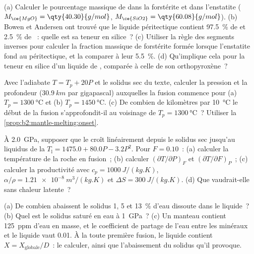 \begin{exercise}[$\star\star$]\label{exo:b2:mantle-melting:6}
(a) Calculer le pourcentage massique de  dans la forstérite  et dans
l'enstatite  ($M_{\ce{MgO}} = \qty{40.30}{g/mol}$, $M_{\ce{SiO2}} =
\qty{60.08}{g/mol}$). (b) Bowen et Andersen ont trouvé que le liquide péritectique contient
\qty{97.5}{\percent} de  et \qty{2.5}{\percent} de ~: quelle est sa
teneur en silice~? (c) Utiliser la règle des segments inverses pour calculer la fraction massique de forstérite
formée lorsque l'enstatite fond au péritectique, et la comparer à leur
\qty{5.5}{\percent}. (d) Qu'implique cela pour la teneur en silice d'un liquide de
, comparée à celle de son orthopyroxène~?
\end{exercise}

\begin{exercise}[$\star\star$]\label{exo:b2:mantle-melting:7}
Avec l'adiabate $T = T_p + 20P$ et le solidus sec du texte, calculer la
pression et la profondeur ($\qty{30.9}{km}$ par gigapascal) auxquelles la fusion commence
pour (a) $T_p = \qty{1300}{\celsius}$ et (b) $T_p = \qty{1450}{\celsius}$. (c) De
combien de kilomètres par \qty{10}{\celsius} le début de la fusion s'approfondit-il au voisinage de
$T_p = \qty{1300}{\celsius}$~? Utiliser la \cref{prop:b2:mantle-melting:onset}.
\end{exercise}

\begin{exercise}[$\star\star$]\label{exo:b2:mantle-melting:8}
À \qty{2.0}{GPa}, supposer que le  croît linéairement depuis le solidus sec jusqu'au
liquidus de la  $T_{\mathrm l} = 1475.0 + 80.0P - 3.2P^2$. Pour $F = 0.10$~:
(a) calculer la température de la roche en fusion~; (b) calculer $(\partial
T/\partial P)_F$ et $(\partial T/\partial F)_P$~; (c) calculer la productivité avec
$c_p = \qty{1000}{J/(kg.K)}$, $\alpha/\rho = \qty{1.21e-8}{m^3/(kg.K)}$ et
$\Delta S = \qty{300}{J/(kg.K)}$. (d) Que vaudrait-elle sans chaleur latente~?
\end{exercise}

\begin{exercise}[$\star\star$]\label{exo:b2:mantle-melting:9}
(a) De combien abaissent le solidus 1, 5 et \qty{13}{\percent} d'eau dissoute dans le liquide~?
(b) Quel est le solidus saturé en eau à \qty{1}{GPa}~? (c) Un manteau
contient \qty{125}{ppm} d'eau en masse, et le coefficient de partage de l'eau entre les
minéraux et le liquide vaut 0.01. À la toute première fusion, le liquide contient $X =
X_{\text{globale}}/D$~: le calculer, ainsi que l'abaissement du solidus qu'il provoque.
\end{exercise}

